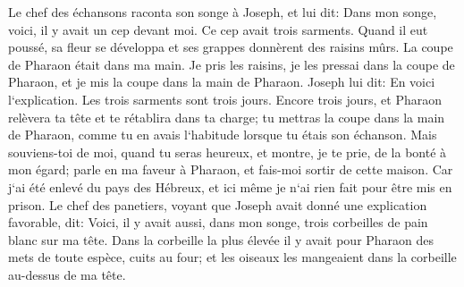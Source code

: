 \verse Le chef des échansons raconta son songe à Joseph, et lui dit: Dans mon songe, voici, il y avait un cep devant moi. 
\verse Ce cep avait trois sarments. Quand il eut poussé, sa fleur se développa et ses grappes donnèrent des raisins mûrs. 
\verse La coupe de Pharaon était dans ma main. Je pris les raisins, je les pressai dans la coupe de Pharaon, et je mis la coupe dans la main de Pharaon. 
\verse Joseph lui dit: En voici l`explication. Les trois sarments sont trois jours. 
\verse Encore trois jours, et Pharaon relèvera ta tête et te rétablira dans ta charge; tu mettras la coupe dans la main de Pharaon, comme tu en avais l`habitude lorsque tu étais son échanson. 
\verse Mais souviens-toi de moi, quand tu seras heureux, et montre, je te prie, de la bonté à mon égard; parle en ma faveur à Pharaon, et fais-moi sortir de cette maison. 
\verse Car j`ai été enlevé du pays des Hébreux, et ici même je n`ai rien fait pour être mis en prison. 
\verse Le chef des panetiers, voyant que Joseph avait donné une explication favorable, dit: Voici, il y avait aussi, dans mon songe, trois corbeilles de pain blanc sur ma tête. 
\verse Dans la corbeille la plus élevée il y avait pour Pharaon des mets de toute espèce, cuits au four; et les oiseaux les mangeaient dans la corbeille au-dessus de ma tête. 
